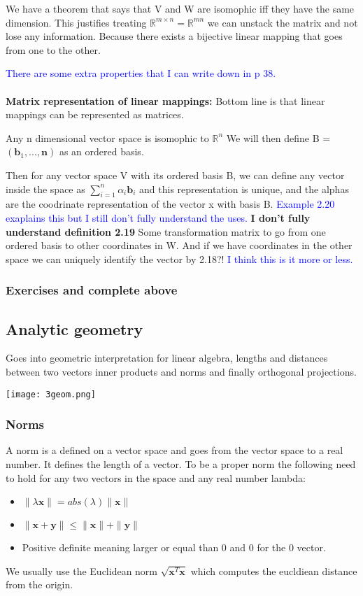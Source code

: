 \documentclass{article}
\newcommand{\tblue}[1]{\textcolor{blue}{#1}}
\begin{document}
We have a theorem that says that V and W are isomophic iff they have the same dimension.
This justifies treating $\mathbb{R}^{m \times n} = \mathbb{R}^{mn} $ we can unstack the matrix and 
not lose any information. Because there exists a bijective linear mapping that goes from one to the other.

\tblue{There are some extra properties that I can write down in p 38.}
\\
\\
\textbf{Matrix representation of linear mappings:}
Bottom line is that linear mappings can be represented as matrices.


Any n dimensional vector space is isomophic to $\mathbb{R}^n$ 
We will then define B = $(\textbf{b}_1,...,\textbf{n})$ as an ordered basis.

Then for any vector space V with its ordered basis B, we can define any vector inside the space
as $\sum_{i=1}^{n}\alpha_i \textbf{b}_i$ and this representation is unique, and the alphas are 
the coodrinate representation of the vector x with basis B.
\tblue{Example 2.20 exaplains this but I still don't fully understand the uses.}
\textbf{I don't fully understand definition 2.19}
Some transformation matrix to go from one ordered basis to other coordinates in W.
And if we have coordinates in the other space we can uniquely identify the vector by 2.18?! \tblue{I think this is it more or less.}

\subsubsection{Exercises and complete above}


\subsection{Analytic geometry}
Goes into geometric interpretation for linear algebra, lengths and distances between two vectors
inner products and norms and finally orthogonal projections.

\begin{center}
    \texttt{[image: 3geom.png]} %
\end{center}

\subsubsection{Norms}
A norm is a defined on a vector space and goes from the vector space to a real number. It defines the length of a vector.
To be a proper norm the following need to hold for any two vectors in the space and any real number lambda:
\begin{itemize}
    \item $\| \lambda \textbf{x} \| = abs(\lambda)\|\textbf{x} \|  $
    \item $\|\textbf{x} + \textbf{y} \| \leq \|\textbf{x} \| + \| \textbf{y} \|  $
    \item Positive definite meaning larger or equal than 0 and 0 for the 0 vector.
\end{itemize}
We usually use the Euclidean norm $\sqrt{\textbf{x}^T\textbf{x}}$ which computes
the eucldiean distance from the origin.
\end{document}
